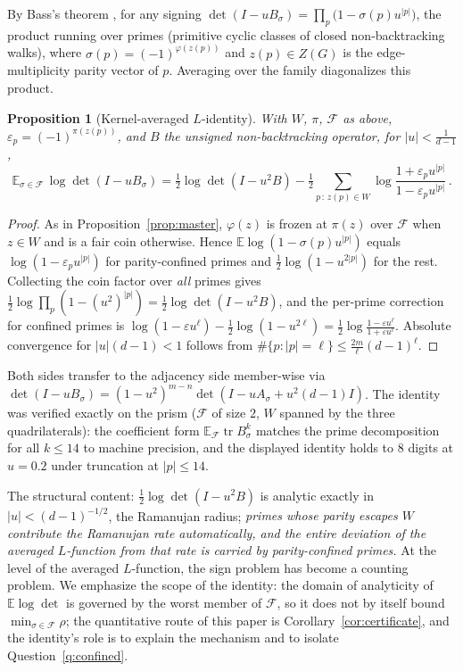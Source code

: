 \documentclass[11pt]{article}
\newtheorem{proposition}[lemma]{Proposition}
\theoremstyle{remark}
\DeclareMathOperator{\tr}{tr}
\begin{document}
By Bass's theorem \cite{bass92}, for any signing
$\det(I-uB_\sigma)=\prod_{p}\big(1-\sigma(p)u^{|p|}\big)$, the product
running over primes (primitive cyclic classes of closed non-backtracking
walks), where $\sigma(p)=(-1)^{\varphi(z(p))}$ and $z(p)\in Z(G)$ is the
edge-multiplicity parity vector of $p$. Averaging over the family
diagonalizes this product.

\begin{proposition}[Kernel-averaged $L$-identity]\label{prop:Lident}
With $W$, $\pi$, $\mathcal F$ as above, $\varepsilon_p=(-1)^{\pi(z(p))}$,
and $B$ the \emph{unsigned} non-backtracking operator, for
$|u|<\tfrac1{d-1}$,
\[
\mathbb E_{\sigma\in\mathcal F}\,\log\det(I-uB_\sigma)
=\tfrac12\log\det(I-u^2B)
-\tfrac12\!\!\sum_{p\,:\,z(p)\in W}\!\!
\log\frac{1+\varepsilon_pu^{|p|}}{1-\varepsilon_pu^{|p|}}\,.
\]
\end{proposition}

\begin{proof}
As in Proposition~\ref{prop:master}, $\varphi(z)$ is frozen at $\pi(z)$
over $\mathcal F$ when $z\in W$ and is a fair coin otherwise. Hence
$\mathbb E\log(1-\sigma(p)u^{|p|})$ equals
$\log(1-\varepsilon_pu^{|p|})$ for parity-confined primes and
$\tfrac12\log(1-u^{2|p|})$ for the rest. Collecting the coin factor over
\emph{all} primes gives
$\tfrac12\log\prod_p(1-(u^2)^{|p|})=\tfrac12\log\det(I-u^2B)$, and the
per-prime correction for confined primes is
$\log(1-\varepsilon u^{\ell})-\tfrac12\log(1-u^{2\ell})
=\tfrac12\log\frac{1-\varepsilon u^{\ell}}{1+\varepsilon u^{\ell}}$.
Absolute convergence for $|u|(d-1)<1$ follows from
$\#\{p:|p|=\ell\}\le\tfrac{2m}{\ell}(d-1)^{\ell}$.
\end{proof}

Both sides transfer to the adjacency side member-wise via
$\det(I-uB_\sigma)=(1-u^2)^{m-n}\det(I-uA_\sigma+u^2(d-1)I)$. The
identity was verified exactly on the prism ($\mathcal F$ of size $2$,
$W$ spanned by the three quadrilaterals): the coefficient form
$\mathbb E_{\mathcal F}\tr B_\sigma^k$ matches the prime decomposition
for all $k\le14$ to machine precision, and the displayed identity holds
to $8$ digits at $u=0.2$ under truncation at $|p|\le14$.

The structural content: $\tfrac12\log\det(I-u^2B)$ is analytic exactly
in $|u|<(d-1)^{-1/2}$, the Ramanujan radius; \emph{primes whose
parity escapes $W$ contribute the Ramanujan rate automatically, and the
entire deviation of the averaged $L$-function from that rate is carried
by parity-confined primes.} At the level of the averaged $L$-function, the sign problem has
become a counting problem. We emphasize the scope of the identity: the
domain of analyticity of $\mathbb E\log\det$ is governed by the worst
member of $\mathcal F$, so it does not by itself bound
$\min_{\sigma\in\mathcal F}\rho$; the quantitative route of this
paper is Corollary~\ref{cor:certificate}, and the identity's role is
to explain the mechanism and to isolate Question~\ref{q:confined}.
\end{document}
